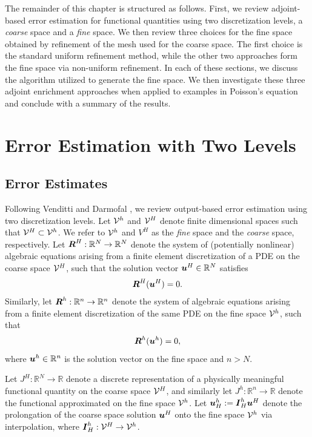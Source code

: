 The remainder of this chapter is structured as follows.
First, we review adjoint-based error estimation for
functional quantities using two discretization levels,
a \emph{coarse} space and a \emph{fine} space. We then
review three choices for the fine space obtained
by refinement of the mesh used for the coarse space.
The first choice is the standard uniform refinement
method, while the other two approaches form the fine
space via non-uniform refinement. In each of these
sections, we discuss the algorithm utilized to generate
the fine space. We then investigate these three
adjoint enrichment approaches when applied to examples
in Poisson's equation
and conclude with a summary of the results.

\section{Error Estimation with Two Levels}

\subsection{Error Estimates}

Following Venditti and Darmofal
\cite{venditti2000adjoint, venditti2002adjoint, venditti2003adjoint},
we review output-based error estimation using two discretization
levels.
Let $\mathcal{V}^h$ and $\mathcal{V}^H$ denote finite dimensional spaces
such that $\mathcal{V}^H \subset \mathcal{V}^h$. We refer to $\mathcal{V}^h$
and $V^H$ as the \emph{fine} space and the \emph{coarse}
space, respectively. Let $\boldsymbol{R}^H : \mathbb{R}^N \to \mathbb{R}^N$
denote the system of (potentially nonlinear) algebraic equations
arising from a finite element discretization of a PDE on the
coarse space $\mathcal{V}^H$, such that the solution vector
$\boldsymbol{u}^H \in \mathbb{R}^N$ satisfies
%
\begin{gather}
\boldsymbol{R}^H(\boldsymbol{u}^H) = 0.
\label{eq:refine_residual_coarse}
\end{gather}
%
Similarly, let $\boldsymbol{R}^h : \mathbb{R}^n \to \mathbb{R}^n$
denote the system of algebraic equations arising from a finite
element discretization of the same PDE on the fine space
$\mathcal{V}^h$, such that
%
\begin{gather}
\boldsymbol{R}^h(\boldsymbol{u}^h) = 0,
\label{eq:refine_residual_fine}
\end{gather}
%
where $\boldsymbol{u}^h \in \mathbb{R}^n$ is the solution vector on
the fine space and $n > N$.

Let $J^H : \mathbb{R}^N \to \mathbb{R}$ denote a discrete
representation of a physically meaningful functional quantity
on the coarse space $\mathcal{V}^H$, and similarly let
$J^h : \mathbb{R}^n \to \mathbb{R}$ denote the functional
approximated on the fine space $\mathcal{V}^h$. Let
$\boldsymbol{u}^h_H := \boldsymbol{I}^h_H \boldsymbol{u}^H$ denote the prolongation of
the coarse space solution $\boldsymbol{u}^H$ onto the fine space
$\mathcal{V}^h$ via interpolation, where
$\boldsymbol{I}^h_H : \mathcal{V}^H \to \mathcal{V}^h$.

